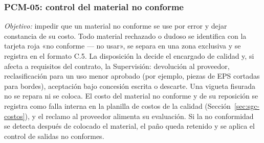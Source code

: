 \subsubsection{PCM-05: control del material no conforme} \emph{Objetivo:} impedir que un material no conforme se use por error y dejar constancia de su costo. Todo material rechazado o dudoso se identifica con la tarjeta roja «no conforme --- no usar», se separa en una zona exclusiva y se registra en el formato C.5. La disposición la decide el encargado de calidad y, si afecta a requisitos del contrato, la Supervisión: devolución al proveedor, reclasificación para un uso menor aprobado (por ejemplo, piezas de EPS cortadas para bordes), aceptación bajo concesión escrita o descarte. Una vigueta fisurada no se repara ni se coloca. El costo del material no conforme y de su reposición se registra como falla interna en la planilla de costos de la calidad (Sección~\ref{sec:sgc-costos}), y el reclamo al proveedor alimenta su evaluación. Si la no conformidad se detecta después de colocado el material, el paño queda retenido y se aplica el control de salidas no conformes.

